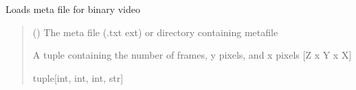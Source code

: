 \documentclass[letterpaper,10pt,english]{sphinxmanual}
\begin{document}

\begin{fulllineitems}
\label{\detokenize{CalSciPy.io:CalSciPy.io.load_binary_meta}}
\pysigstartsignatures
{}
\pysigstopsignatures
\sphinxAtStartPar
Loads meta file for binary video
\begin{quote}\begin{description}
\sphinxAtStartPar
{} (\sphinxstyleliteralemphasis{\sphinxupquote{{[}}}\sphinxstyleliteralemphasis{\sphinxupquote{, }}\sphinxstyleliteralemphasis{\sphinxupquote{{]}}}) \sphinxhyphen{}\sphinxhyphen{} The meta file (.txt ext) or directory containing metafile

\sphinxAtStartPar
A tuple containing the number of frames, y pixels, and x pixels {[}Z x Y x X{]}

\sphinxAtStartPar
tuple{[}int, int, int, str{]}

\end{description}\end{quote}

\end{fulllineitems}

\end{document}
